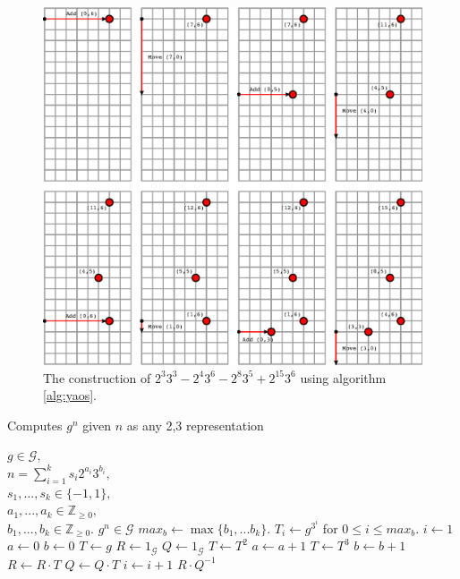 \documentclass{ucalgthes1}
\theoremstyle{plain}
\theoremstyle{definition}
\newcommand{\ZZgez}{\mathbb{Z}_{\ge 0}}
\begin{document}
\begin{figure}[htb!]
\centering
\includegraphics{yao1}
\caption{The construction of $2^3 3^3 - 2^4 3^6 - 2^8 3^5 + 2^{15} 3^6$ using algorithm \ref{alg:yaos}.}
\label{fig:FigureExample}
\end{figure}

\begin{algorithm}[htb!]
\caption{Computes $g^n$ given $n$ as any 2,3 representation}\label{alg:yaos}
\begin{algorithmic}[1]
\REQUIRE $g \in \mathcal G,$ \\
$n = \sum_{i=1}^k s_i2^{a_i}3^{b_i},$ \\
$s_1,...,s_k \in \{-1, 1\},$ \\
$a_1,...,a_k \in \ZZgez,$ \\
$b_1,...,b_k \in \ZZgez.$
\ENSURE $g^n \in \mathcal G$
\STATE $max_b \gets \max \{ b_1, ... b_k \}$.
\STATE $T_i \gets g^{3^i}$ for $0 \le i \le max_b$.
\STATE $i \gets 1$
\STATE $a \gets 0$ 
\STATE $b \gets 0$ 
\STATE $T \gets g$ 
\STATE $R \gets 1_{\mathcal G}$ 
\STATE $Q \gets 1_{\mathcal G}$ 
		\STATE $T \gets T^2$
		\STATE $a \gets a + 1$
	\ENDWHILE
		\STATE $T \gets T^3$
		\STATE $b \gets b + 1$
	\ENDWHILE
		\STATE $R \gets R \cdot T$
	\ELSE
		\STATE $Q \gets Q \cdot T$
	\ENDIF
	\STATE $i \gets i + 1$
\ENDWHILE
\RETURN $R \cdot Q^{-1}$
\end{algorithmic}
\end{algorithm}
\end{document}
